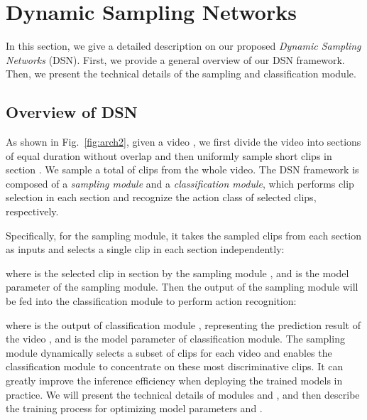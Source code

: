 \documentclass[journal]{IEEEtran}
\begin{document}
\section{Dynamic Sampling Networks}
\label{sec:dsn}

In this section, we give a detailed description on our proposed {\em Dynamic Sampling Networks} (DSN).
First, we provide a general overview of our DSN framework.
Then, we present the technical details of the sampling and classification module.

\subsection{Overview of DSN}
As shown in Fig.~\ref{fig:arch2}, given a video , we first divide the video into  sections  of equal duration without overlap and then uniformly sample  short clips   in section .
We sample a total of  clips from the whole video.
The DSN framework is composed of a {\em sampling module} and a {\em classification module}, which performs clip selection in each section and recognize the action class of selected clips, respectively.

Specifically, for the sampling module, it takes the sampled clips from each section as inputs and selects a single clip in each section independently:

where  is the selected clip in section  by the sampling module , and  is the model parameter of the sampling module.
Then the output of the sampling module will be fed into the classification module to perform action recognition:

where  is the output of classification module , representing the prediction result of the video , and  is the model parameter of classification module.
The sampling module dynamically selects a subset of clips for each video and enables the classification module to concentrate on these most discriminative clips. It can greatly improve the inference efficiency when deploying the trained models in practice.
We will present the technical details of modules  and , and then describe the training process for optimizing model parameters  and .
\end{document}
